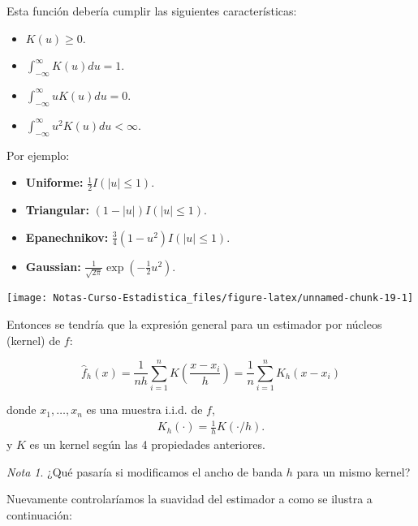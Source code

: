 \documentclass[
  12pt,
]{book}
\providecommand{\tightlist}{%
  \setlength{\itemsep}{0pt}\setlength{\parskip}{0pt}}
\theoremstyle{definition}
\theoremstyle{definition}
\theoremstyle{definition}
\theoremstyle{definition}
\theoremstyle{remark}
\newtheorem*{remark}{Nota}
\begin{document}
Esta función debería cumplir las siguientes características:

\begin{itemize}
\tightlist
\item
  \(K(u)\geq 0\).
\item
  \(\int_{-\infty}^{\infty} K(u)du = 1\).
\item
  \(\int_{-\infty}^{\infty} u K(u)du = 0\).
\item
  \(\int_{-\infty}^{\infty} u^{2} K(u)du <\infty\).
\end{itemize}

Por ejemplo:

\begin{itemize}
\tightlist
\item
  \textbf{Uniforme:} \(\frac{1}{2} I \left( \left\vert u \right\vert \leq 1 \right)\).
\item
  \textbf{Triangular:} \((1-|u|) I \left( \left\vert u \right\vert \leq 1 \right)\).
\item
  \textbf{Epanechnikov:} \(\frac{3}{4} (1-u^{2}) I \left( \left\vert u \right\vert \leq 1 \right)\).
\item
  \textbf{Gaussian:} \(\frac{1}{\sqrt{2\pi}} \exp \left( -\frac{1}{2}u^{2} \right)\).
\end{itemize}

\begin{center}\texttt{[image: Notas-Curso-Estadistica\_files/figure-latex/unnamed-chunk-19-1]} \end{center}

Entonces se tendría que la expresión general para un estimador por núcleos (kernel) de \(f\):

\begin{equation*}
\hat{f}_{h}\left( x \right) = \frac{1}{nh}\sum_{i=1}^{n} K\left( \frac{x-x_{i}}{h} \right)=\frac{1}{n}\sum_{i=1}^{n} K_h(x-x_{i}) 
\end{equation*}

donde \(x_1,\ldots,x_n\) es una muestra i.i.d. de \(f\),
\begin{align*}
K_h(\cdot)=\frac 1 h K(\cdot /h).
\end{align*}
y \(K\) es un kernel según las 4 propiedades anteriores.

\begin{remark}
¿Qué pasaría si modificamos el ancho de banda \(h\) para un mismo kernel?
\end{remark}

Nuevamente controlaríamos la suavidad del estimador a como se ilustra a continuación:
\end{document}
